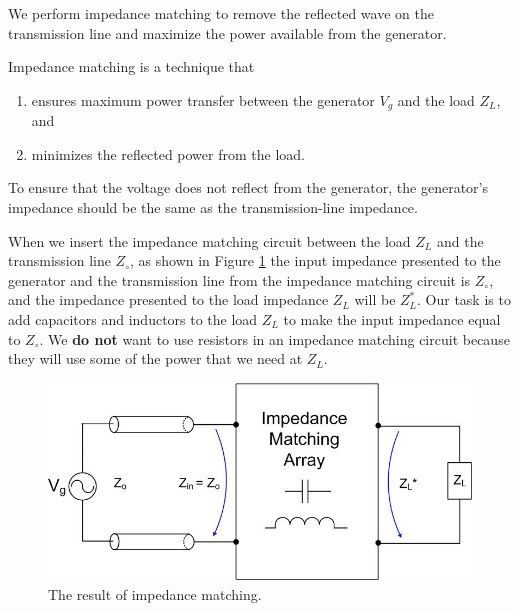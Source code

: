 \documentclass{ximera}
\begin{document}
We perform impedance matching to remove the reflected wave on the transmission line and maximize the power available from the generator.

Impedance matching is a technique that 
\begin{enumerate}
\item ensures maximum power transfer between the generator $V_g$ and the load $Z_L$, and 
\item minimizes the reflected power from the load. 
\end{enumerate}

To ensure that the voltage does not reflect from the generator, the generator's impedance should be the same as the transmission-line impedance. 


  When we insert the impedance matching circuit between the load $Z_L$ and the transmission line $Z_\circ$, as shown in Figure  \ref{eq:impmatchgen1} the input impedance presented to the generator and the transmission line from the impedance matching circuit is $Z_\circ$, and the impedance presented to the load impedance $Z_L$ will be $Z_L^*$. Our task is to add capacitors and inductors to the load $Z_L$ to make the input impedance equal to $Z_\circ$. We {\bf do not} want to use resistors in an impedance matching circuit because they will use some of the power that we need at $Z_L$.  

 

\begin{figure}[htbp]
\begin{center}
\includegraphics[scale=0.4]{../jpg/Impedancematching.jpg}
\end{center}
\caption{The result of impedance matching.}
\label{eq:impmatchgen1}
\end{figure}
\end{document}

